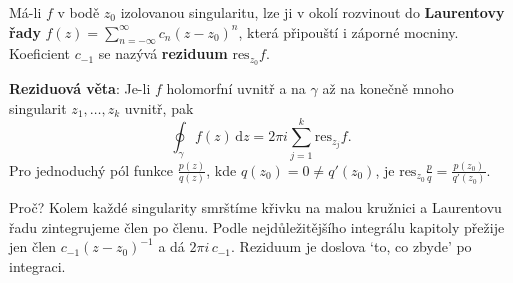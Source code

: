 \begin{definitionbox}
  Má-li $f$ v bodě $z_0$ izolovanou singularitu, lze ji v okolí rozvinout do \textbf{Laurentovy řady} $f(z) = \sum_{n=-\infty}^{\infty}c_n{(z - z_0)}^n$, která připouští i záporné mocniny. Koeficient $c_{-1}$ se nazývá \textbf{reziduum} $\mathrm{res}_{z_0}f$.

  \vspace{0.2cm}

  \textbf{Reziduová věta}: Je-li $f$ holomorfní uvnitř a na $\gamma$ až na konečně mnoho singularit $z_1, \dots, z_k$ uvnitř, pak
  \begin{equation*}
    \oint_\gamma f(z)\,\mathrm{d}z = 2\pi i\sum_{j=1}^{k}\mathrm{res}_{z_j}f.
  \end{equation*}
  Pro jednoduchý pól funkce $\frac{p(z)}{q(z)}$, kde $q(z_0) = 0\neq q'(z_0)$, je $\mathrm{res}_{z_0}\frac{p}{q} = \frac{p(z_0)}{q'(z_0)}$.
\end{definitionbox}

Proč? Kolem každé singularity smrštíme křivku na malou kružnici a Laurentovu řadu zintegrujeme člen po členu. Podle nejdůležitějšího integrálu kapitoly přežije jen člen $c_{-1}{(z - z_0)}^{-1}$ a dá $2\pi i\,c_{-1}$. Reziduum je doslova `to, co zbyde' po integraci.

